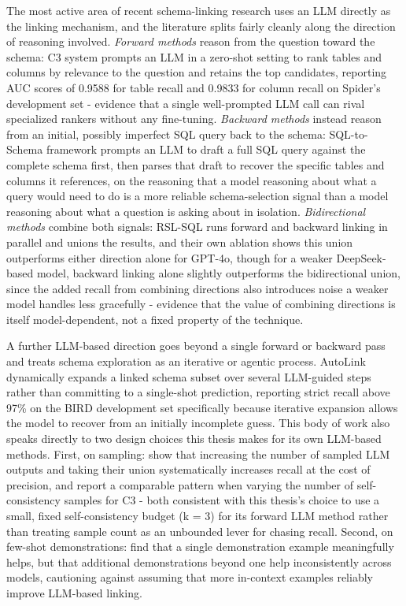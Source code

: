 The most active area of recent schema-linking research uses an LLM directly as the linking mechanism, and the literature splits fairly cleanly along the direction of reasoning involved. \emph{Forward methods} reason from the question toward the schema: \citet{dong2023} C3 system prompts an LLM in a zero-shot setting to rank tables and columns by relevance to the question and retains the top candidates, reporting AUC scores of 0.9588 for table recall and 0.9833 for column recall on Spider's development set - evidence that a single well-prompted LLM call can rival specialized rankers without any fine-tuning. \emph{Backward methods} instead reason from an initial, possibly imperfect SQL query back to the schema: \citet{yang2024} SQL-to-Schema framework prompts an LLM to draft a full SQL query against the complete schema first, then parses that draft to recover the specific tables and columns it references, on the reasoning that a model reasoning about what a query would need to do is a more reliable schema-selection signal than a model reasoning about what a question is asking about in isolation. \emph{Bidirectional methods} combine both signals: \citet{cao2024} RSL-SQL runs forward and backward linking in parallel and unions the results, and their own ablation shows this union outperforms either direction alone for GPT-4o, though for a weaker DeepSeek-based model, backward linking alone slightly outperforms the bidirectional union, since the added recall from combining directions also introduces noise a weaker model handles less gracefully - evidence that the value of combining directions is itself model-dependent, not a fixed property of the technique.

A further LLM-based direction goes beyond a single forward or backward pass and treats schema exploration as an iterative or agentic process. \citet{wang2025b} AutoLink dynamically expands a linked schema subset over several LLM-guided steps rather than committing to a single-shot prediction, reporting strict recall above 97\% on the BIRD development set specifically because iterative expansion allows the model to recover from an initially incomplete guess. This body of work also speaks directly to two design choices this thesis makes for its own LLM-based methods. First, on sampling: \citet{katsogiannismeimarakis2026} show that increasing the number of sampled LLM outputs and taking their union systematically increases recall at the cost of precision, and \citet{dong2023} report a comparable pattern when varying the number of self-consistency samples for C3 - both consistent with this thesis's choice to use a small, fixed self-consistency budget (k = 3) for its forward LLM method rather than treating sample count as an unbounded lever for chasing recall. Second, on few-shot demonstrations: \citet{katsogiannismeimarakis2026} find that a single demonstration example meaningfully helps, but that additional demonstrations beyond one help inconsistently across models, cautioning against assuming that more in-context examples reliably improve LLM-based linking.

